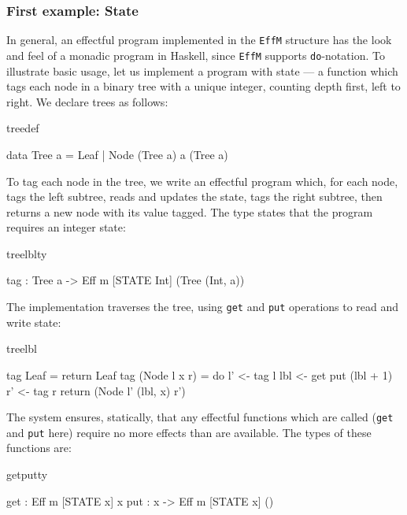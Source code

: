 \subsubsection{First example: State}

In general, an effectful program implemented in the \texttt{EffM} structure has
the look and feel of a monadic program in Haskell, since \texttt{EffM} supports
\texttt{do}-notation. To illustrate basic usage, let us implement
a program with state --- a function which tags each node in a binary tree with
a unique integer, counting depth first, left to right. We declare trees as
follows:

\begin{SaveVerbatim}{treedef}

data Tree a = Leaf 
            | Node (Tree a) a (Tree a)

\end{SaveVerbatim}

\noindent
To tag each node in the tree, we write an effectful program which, for each
node, tags the left subtree, reads and updates the state, tags the right
subtree, then returns a new node with its value tagged. The type
states that the program requires an integer state:

\begin{SaveVerbatim}{treelblty}

tag : Tree a -> Eff m [STATE Int] (Tree (Int, a))

\end{SaveVerbatim}

\noindent
The implementation traverses the tree, using \texttt{get} and \texttt{put}
operations to read and write state:

\begin{SaveVerbatim}{treelbl}

tag Leaf = return Leaf
tag (Node l x r) 
     = do l' <- tag l
          lbl <- get
          put (lbl + 1)
          r' <- tag r
          return (Node l' (lbl, x) r')

\end{SaveVerbatim}

\noindent
The \Eff{} system ensures, statically, that any
effectful functions which are called (\texttt{get} and \texttt{put} here)
require no more effects than are available.
The types of these functions are:

\begin{SaveVerbatim}{getputty}

get : Eff m [STATE x] x
put : x -> Eff m [STATE x] ()

\end{SaveVerbatim}

